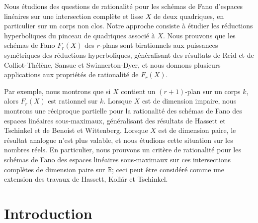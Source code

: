 \documentclass[JEP,XML,SOM,Unicode,NoEqCountersInSection,published]{cedram}
\theoremstyle{plain}
\theoremstyle{definition}
\begin{document}




\begin{altabstract}
Nous étudions des questions de rationalité pour les schémas de Fano d'espaces linéaires sur une intersection complète et lisse $X$ de deux quadriques, en particulier sur un corps non clos. Notre approche consiste à étudier les réductions hyperboliques du pinceau de quadriques associé à $X$. Nous prouvons que les schémas de Fano $F_r(X)$ des $r$-plans sont birationnels aux puissances symétriques des réductions hyperboliques, généralisant des résultats de Reid et de Colliot-Thélène, Sansuc et Swinnerton-Dyer, et nous donnons plusieurs applications aux propriétés de rationalité de $F_r(X)$.

Par exemple, nous montrons que si $X$ contient un $(r+1)$-plan sur un corps $k$, alors $F_r(X)$ est rationnel sur $k$. Lorsque $X$ est de dimension impaire, nous montrons une réciproque partielle pour la rationalité des schémas de Fano des espaces linéaires sous-maximaux, généralisant des résultats de Hassett et Tschinkel et de Benoist et Wittenberg. Lorsque $X$ est de dimension paire, le résultat analogue n'est plus valable, et nous étudions cette situation sur les nombres réels. En particulier, nous prouvons un critère de rationalité pour les schémas de Fano des espaces linéaires sous-maximaux sur ces intersections complètes de dimension paire sur $\mathbb R$; ceci peut être considéré comme une extension des travaux de Hassett, Kollár et Tschinkel.
\end{altabstract}

\maketitle

\tableofcontents
\mainmatter

\section{Introduction}
\end{document}
